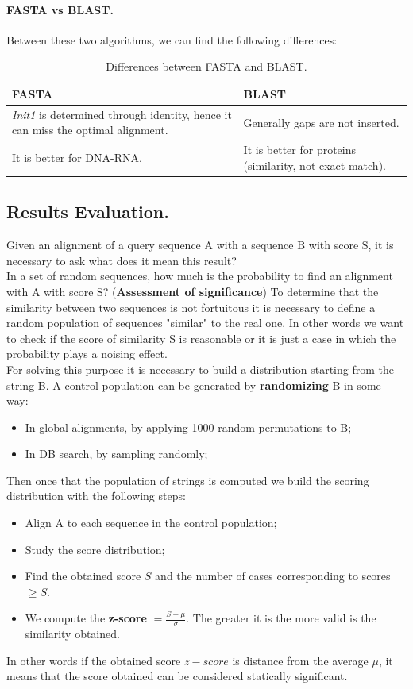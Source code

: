 \paragraph*{FASTA vs BLAST.} Between these two algorithms, we can find the following differences:
\begin{table}[H]
	\centering
	\begin{tabular}{| p{7cm} | p{7cm}|}
		\hline
		\textbf{FASTA} & \textbf{BLAST} \\
		\hline
		\textit{Init1} is determined through identity, hence it can miss the optimal alignment. & Generally gaps are not inserted.\\
		\hline
		It is better for DNA-RNA. & It is better for proteins (similarity, not exact match). \\
		\hline
	\end{tabular}
	\caption{Differences between FASTA and BLAST.}
\end{table}

\subsection{Results Evaluation.}
Given an alignment of a query sequence A with a sequence B with score S, it is necessary to ask what does it mean this result?\\ 
In a set of random sequences, how much is the probability to find an alignment with A with score S? (\textbf{Assessment of significance}) To determine that the similarity between two sequences is not fortuitous it is necessary to define a random population of sequences "similar" to the real one. In other words we want to check if the score of similarity S is reasonable or it is just a case in which the probability plays a noising effect. \\
For solving this purpose it is necessary to build a distribution starting from the string B. A control population can be generated by \textbf{randomizing} B in some way:
\begin{itemize}
	\item In global alignments, by applying 1000 random permutations to B;
	\item In DB search, by sampling randomly;   
\end{itemize}
Then once that the population of strings is computed we build the scoring distribution with the following steps:
\begin{itemize}
	\item Align A to each sequence in the control population;
	\item Study the score distribution;
	\item Find the obtained score $S$ and the number of cases corresponding to scores $\geq S$.
	\item We compute the \textbf{z-score} $= \frac{S-\mu}{\sigma}$. The greater it is the more valid is the similarity obtained.
\end{itemize}
In other words if the obtained score $z-score$ is distance from the average $\mu$, it means that the score obtained can be considered statically significant.

